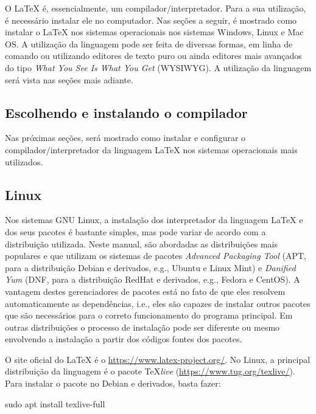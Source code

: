O \LaTeX{} é, essencialmente, um compilador/interpretador. Para a sua utilização, é necessário instalar ele no computador. Nas seções a seguir, é mostrado como instalar o \LaTeX{} nos sistemas operacionais nos sistemas Windows, Linux e Mac OS. A utilização da linguagem pode ser feita de diversas formas, em linha de comando ou utilizando editores de texto puro ou ainda editores mais avançados do tipo \textit{What You See Is What You Get} (WYSIWYG). A utilização da linguagem será vista nas seções mais adiante.
 
\subsection{Escolhendo e instalando o compilador}
\label{sec:compilador}

Nas próximas seções, será mostrado como instalar e configurar o compilador/interpretador da linguagem \LaTeX{} nos sistemas operacionais mais utilizados.

\subsection*{Linux}
\label{sec:linux}

Nos sistemas GNU Linux, a instalação dos interpretador da linguagem \LaTeX{} e dos seus pacotes é bastante simples, mas pode variar de acordo com a distribuição utilizada. Neste manual, são abordadas as distribuições mais populares e que utilizam os sistemas de pacotes \textit{Advanced Packaging Tool} (APT, para a distribuição Debian e derivados, e.g., Ubuntu e Linux Mint) e \textit{Danified Yum} (DNF, para a distribuição RedHat e derivados, e.g., Fedora e CentOS). A vantagem destes gerenciadores de pacotes está no fato de que eles resolvem automaticamente as dependências, i.e., eles são capazes de instalar outros pacotes que são necessários para o correto funcionamento do programa principal. Em outras distribuições o processo de instalação pode ser diferente ou mesmo envolvendo a instalação a partir dos códigos fontes dos pacotes. 

O site oficial do \LaTeX{} é o \url{https://www.latex-project.org/}. No Linux, a principal distribuição da linguagem é o pacote \TeX \textit{live} (\url{https://www.tug.org/texlive/}). Para instalar o pacote no Debian e derivados, basta fazer:

\begin{meucomando}
sudo apt install texlive-full
\end{meucomando}

